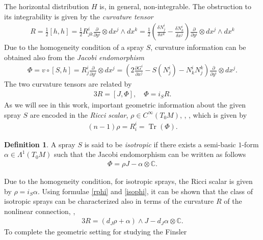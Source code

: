 \documentclass[oneside,english]{amsart}
\numberwithin{equation}{section}
\numberwithin{figure}{section}
\theoremstyle{plain}
\theoremstyle{plain}
\theoremstyle{definition}
\newtheorem{defn}[thm]{Definition}
\theoremstyle{plain}
\theoremstyle{plain}
\theoremstyle{plain}
\theoremstyle{remark}
\theoremstyle{remark}
\begin{document}
The horizontal distribution $H$ is, in general, non-integrable. The
obstruction to its integrability is given by the \emph{curvature tensor}  
\begin{eqnarray}
  R=\frac{1}{2}[h,h]=\frac{1}{2}R^i_{jk}\frac{\partial}{\partial
    y^i}\otimes dx^j \wedge dx^k = \frac{1}{2}\left(\frac{\delta
      N^i_j}{\delta x^k} - \frac{\delta
      N^i_k}{\delta x^j} \right)\frac{\partial}{\partial
    y^i}\otimes dx^j \wedge dx^k 
  \label{curvature} \end{eqnarray}
Due to the homogeneity condition of a spray $S$, curvature
information can be obtained also from the \emph{Jacobi endomorphism}
\begin{eqnarray}
  \Phi=v\circ [S,h] = R^i_j \frac{\partial}{\partial y^i}\otimes dx^j =
  \left(2\frac{\partial G^i}{\partial x^j} - S(N^i_j) -
    N^i_kN^k_j\right) \frac{\partial}{\partial y^i}\otimes
  dx^j. \label{localphi} \end{eqnarray} 
The two curvature tensors are related by 
\begin{eqnarray}
  3R=[J, \Phi], \quad \Phi = i_SR. \label{rphi} \end{eqnarray}
As we will see in this work, important geometric information
about the given spray $S$ are encoded in the \emph{Ricci scalar},
$\rho\in  C^{\infty}(T_0M)$,  \cite{BR04}, \cite[Def. 8.1.7]{Shen01}, which is given by
\begin{eqnarray}
  (n-1)\rho = R^i_i=\operatorname{Tr}(\Phi). \label{ricr} \end{eqnarray}
\begin{defn} \label{defn:iso}
  A spray $S$ is said to be \emph{isotropic} if there exists a semi-basic $1$-form $\alpha
  \in \Lambda^1(T_0M)$ such that the Jacobi endomorphism can be
  written as follows
  \begin{eqnarray}
    \Phi = \rho J-\alpha \otimes \mathbb{C}. \label{isophi} \end{eqnarray}
\end{defn}
Due to the homogeneity condition, for isotropic sprays, the Ricci
scalar is given by $\rho=i_S\alpha$. Using formulae \eqref{rphi} and
\eqref{isophi}, it can be shown that the class of isotropic sprays can
be characterized also in terms of the curvature $R$ of the nonlinear connection,
\cite[Prop. 3.4]{BM11},
\begin{eqnarray}
  3R= \left(d_J\rho +\alpha\right)\wedge J -d_J\alpha \otimes
  \mathbb{C}. \label{isor}\end{eqnarray} 
To complete the geometric setting for studying the Finsler
\end{document}
